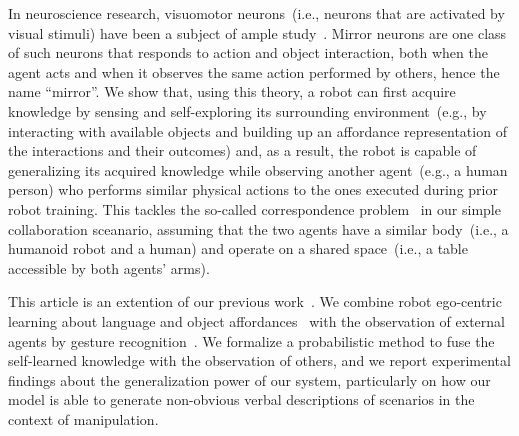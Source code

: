 In neuroscience research, visuomotor neurons~(i.e., neurons that are activated by visual stimuli) have been a subject of ample study~\cite{rizzolatti:2001:nrn}.
Mirror neurons are one class of such neurons that responds to action and object interaction, both when the agent acts and when it observes the same action performed by others, hence the name ``mirror''.
We show that, using this theory, a robot can first acquire knowledge by sensing and self-exploring its surrounding environment~(e.g., by interacting with available objects and building up an affordance representation of the interactions and their outcomes) and, as a result, the robot is capable of generalizing its acquired knowledge while observing another agent~(e.g., a human person) who performs similar physical actions to the ones executed during prior robot training.
This tackles the so-called correspondence problem~\cite{nehaniv:2002:correspondence} in our simple collaboration sceanario, assuming that the two agents have a similar body~(i.e., a humanoid robot and a human) and operate on a shared space~(i.e., a table accessible by both agents' arms).

This article is an extention of our previous work~\cite{saponaro:2017:glu}.
We combine robot ego-centric learning about language and object affordances~\cite{salvi:2012:smcb} with the observation of external agents by gesture recognition~\cite{saponaro:2013:crhri}.
We formalize a probabilistic method to fuse the self-learned knowledge with the observation of others, and we report experimental findings about the generalization power of our system, particularly on how our model is able to generate non-obvious verbal descriptions of \hri{} scenarios in the context of manipulation.


